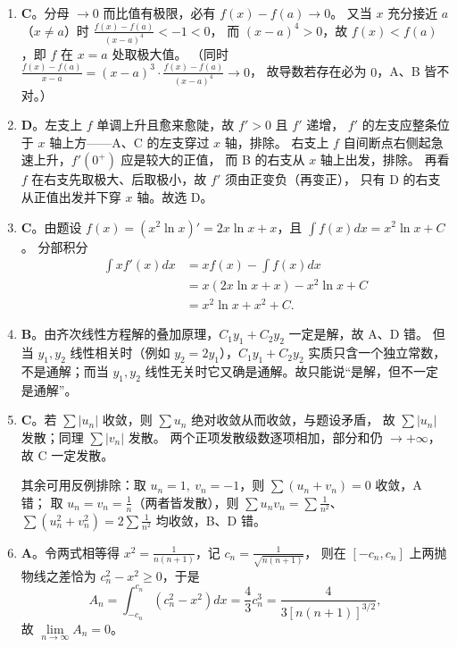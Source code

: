 \begin{enumerate}
{\begin{enumerate}
	\item
	\textbf{C}。分母 $\to0$ 而比值有极限，必有 $f(x)-f(a)\to0$。
	又当 $x$ 充分接近 $a$（$x\neq a$）时 $\frac{f(x)-f(a)}{(x-a)^4}<-1<0$，
	而 $(x-a)^4>0$，故 $f(x)<f(a)$，即 $f$ 在 $x=a$ 处取极大值。
	（同时 $\frac{f(x)-f(a)}{x-a}=(x-a)^3\cdot\frac{f(x)-f(a)}{(x-a)^4}\to0$，
	故导数若存在必为 $0$，A、B 皆不对。）

	\item
	\textbf{D}。左支上 $f$ 单调上升且愈来愈陡，故 $f'>0$ 且 $f'$ 递增，
	$f'$ 的左支应整条位于 $x$ 轴上方——A、C 的左支穿过 $x$ 轴，排除。
	右支上 $f$ 自间断点右侧起急速上升，$f'(0^{+})$ 应是较大的正值，
	而 B 的右支从 $x$ 轴上出发，排除。
	再看 $f$ 在右支先取极大、后取极小，故 $f'$ 须由正变负（再变正），
	只有 D 的右支从正值出发并下穿 $x$ 轴。故选 D。

	\item
	\textbf{C}。由题设 $f(x)=\left(x^2\ln x\right)'=2x\ln x+x$，且 $\int f(x)dx=x^2\ln x+C$。
	分部积分
	\begin{align*}
	\int xf'(x)dx&=xf(x)-\int f(x)dx\\
	&=x\left(2x\ln x+x\right)-x^2\ln x+C\\
	&=x^2\ln x+x^2+C .
	\end{align*}

	\item
	\textbf{B}。由齐次线性方程解的叠加原理，$C_1y_1+C_2y_2$ 一定是解，故 A、D 错。
	但当 $y_1,y_2$ 线性相关时（例如 $y_2=2y_1$），$C_1y_1+C_2y_2$ 实质只含一个独立常数，
	不是通解；而当 $y_1,y_2$ 线性无关时它又确是通解。故只能说“是解，但不一定是通解”。

	\item
	\textbf{C}。若 $\sum|u_n|$ 收敛，则 $\sum u_n$ 绝对收敛从而收敛，与题设矛盾，
	故 $\sum|u_n|$ 发散；同理 $\sum|v_n|$ 发散。
	两个正项发散级数逐项相加，部分和仍 $\to+\infty$，故 C 一定发散。

	其余可用反例排除：取 $u_n=1,\ v_n=-1$，则 $\sum\left(u_n+v_n\right)=0$ 收敛，A 错；
	取 $u_n=v_n=\frac1n$（两者皆发散），则 $\sum u_nv_n=\sum\frac{1}{n^2}$、
	$\sum\left(u_n^2+v_n^2\right)=2\sum\frac1{n^2}$ 均收敛，B、D 错。

	\item
	\textbf{A}。令两式相等得 $x^2=\frac{1}{n(n+1)}$，记 $c_n=\frac{1}{\sqrt{n(n+1)}}$，
	则在 $\left[-c_n,c_n\right]$ 上两抛物线之差恰为 $c_n^2-x^2\geqslant0$，于是
	\[
	A_n=\int_{-c_n}^{c_n}\left(c_n^2-x^2\right)dx=\frac43c_n^3
	=\frac{4}{3\left[n(n+1)\right]^{3/2}} ,
	\]
	故 $\lim\limits_{n\to\infty}A_n=0$。
\end{enumerate}
}



\end{enumerate}
